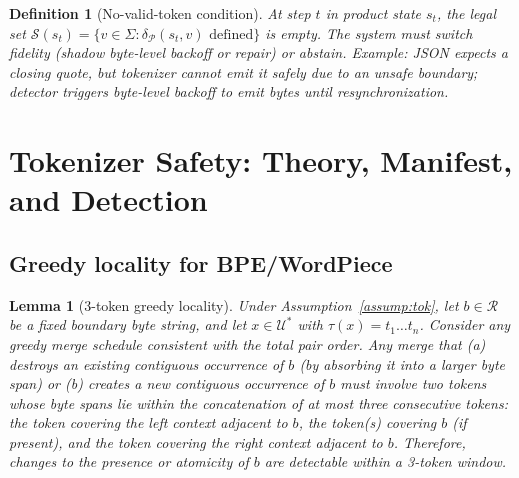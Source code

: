 \documentclass{article}
\newtheorem{lemma}{Lemma}
\newtheorem{definition}{Definition}
\begin{document}
\begin{definition}[No-valid-token condition]
At step $t$ in product state $s_t$, the legal set $\mathcal{S}(s_t)=\{v\in\Sigma:\delta_{\mathcal{P}}(s_t,v)\text{ defined}\}$ is empty. The system must switch fidelity (shadow byte-level backoff or repair) or abstain. Example: JSON expects a closing quote, but tokenizer cannot emit it safely due to an unsafe boundary; detector triggers byte-level backoff to emit bytes until resynchronization.
\end{definition}

\section{Tokenizer Safety: Theory, Manifest, and Detection}\label{sec:tokenizers}
\subsection{Greedy locality for BPE/WordPiece}
\begin{lemma}[3-token greedy locality]\label{lem:local}
Under Assumption~\ref{assump:tok}, let $b\in\mathcal{R}$ be a fixed boundary byte string, and let $x\in\mathcal{U}^\ast$ with $\tau(x)=t_1\dots t_n$. Consider any greedy merge schedule consistent with the total pair order. Any merge that (a) destroys an existing contiguous occurrence of $b$ (by absorbing it into a larger byte span) or (b) creates a new contiguous occurrence of $b$ must involve two tokens whose byte spans lie within the concatenation of at most three consecutive tokens: the token covering the left context adjacent to $b$, the token(s) covering $b$ (if present), and the token covering the right context adjacent to $b$. Therefore, changes to the presence or atomicity of $b$ are detectable within a 3-token window.
\end{lemma}
\end{document}
